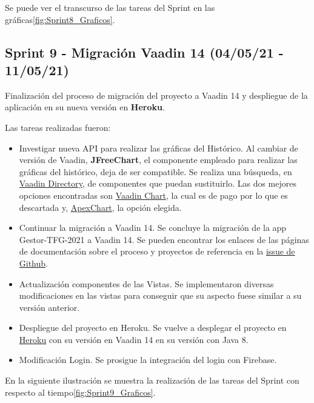 Se puede ver el transcurso de las tareas del Sprint en las gráficas\ref{fig:Sprint8_Graficos}.



\subsection{Sprint 9 - Migración Vaadin 14 (04/05/21 - 11/05/21)}
Finalización del proceso de migración del proyecto a Vaadin 14 y despliegue de la aplicación en su nueva versión en \textbf{Heroku}.

Las tareas realizadas fueron:
\begin{itemize}
	\tightlist
	\item Investigar nueva API para realizar las gráficas del Histórico.
		Al cambiar de versión de Vaadin, \textbf{JFreeChart}, el componente empleado para realizar las gráficas del histórico, deja de ser compatible. Se realiza una búsqueda, en \href{https://vaadin.com/directory}{Vaadin Directory}, de componentes que puedan sustituirlo. Las dos mejores opciones encontradas son \href{https://vaadin.com/components/vaadin-charts}{Vaadin Chart}, la cual es de pago por lo que es descartada y, \href{https://apexcharts.com/}{ApexChart}, la opción elegida.
	\item Continuar la migración a Vaadin 14.
		Se concluye la migración de la app Gestor-TFG-2021 a Vaadin 14. Se pueden encontrar los enlaces de las páginas de documentación sobre el proceso y proyectos de referencia en la \href{https://github.com/dbo1001/Gestor-TFG-2021/issues/104}{issue de Github}.
	\item Actualización componentes de las Vistas.
		Se implementaron diversas modificaciones en las vistas para conseguir que su aspecto fuese similar a su versión anterior.
	\item Despliegue del proyecto en Heroku.
		Se vuelve a desplegar el proyecto en \href{https://gestor-tfg-2021.herokuapp.com/}{Heroku} con su versión en Vaadin 14 en su versión con Java 8.
	\item Modificación Login.
		Se prosigue la integración del login con Firebase.
	
\end{itemize}

En la siguiente ilustración se muestra la realización de las tareas del Sprint con respecto al tiempo\ref{fig:Sprint9_Graficos}.

